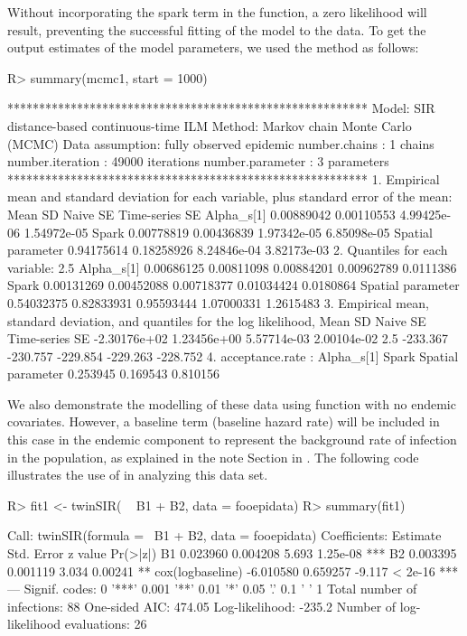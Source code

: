\documentclass[nojss,shortnames]{jss}
\begin{document}
Without incorporating the spark term in the  function, a zero likelihood will result, preventing the successful fitting of the model to the data. To get the output estimates of the model parameters, we used the  method  as follows:
\begin{Sinput}
R> summary(mcmc1, start = 1000)
\end{Sinput}
\begin{Soutput}
********************************************************* 
Model: SIR distance-based continuous-time ILM 
Method: Markov chain Monte Carlo (MCMC) 
Data assumption: fully observed epidemic 
number.chains : 1 chains 
number.iteration : 49000 iterations 
number.parameter : 3 parameters 
********************************************************* 
 1. Empirical mean and standard deviation for each variable,
plus standard error of the mean:
                        Mean         SD    Naive SE Time-series SE
Alpha_s[1]        0.00889042 0.00110553 4.99425e-06    1.54972e-05
Spark             0.00778819 0.00436839 1.97342e-05    6.85098e-05
Spatial parameter 0.94175614 0.18258926 8.24846e-04    3.82173e-03
 2. Quantiles for each variable:
                        2.5%        25%        50%        75%     97.5%
Alpha_s[1]        0.00686125 0.00811098 0.00884201 0.00962789 0.0111386
Spark             0.00131269 0.00452088 0.00718377 0.01034424 0.0180864
Spatial parameter 0.54032375 0.82833931 0.95593444 1.07000331 1.2615483
 3. Empirical mean, standard deviation, and quantiles for the log likelihood,
          Mean             SD       Naive SE Time-series SE 
  -2.30176e+02    1.23456e+00    5.57714e-03    2.00104e-02 
    2.5%      25%      50%      75%    97.5% 
-233.367 -230.757 -229.854 -229.263 -228.752 
 4. acceptance.rate : 
       Alpha_s[1]             Spark Spatial parameter 
         0.253945          0.169543          0.810156 
\end{Soutput}

We also demonstrate the modelling of these data using  function with no endemic covariates. However, a baseline term (baseline hazard rate) will be included in this case in the endemic component to represent the background rate of infection in the population, as explained in the note Section in . The following code illustrates the use of  in analyzing this data set.
\begin{Sinput}
R> fit1 <- twinSIR( ~ B1 + B2, data = fooepidata)
R> summary(fit1)
\end{Sinput}
\begin{Soutput}
Call:
twinSIR(formula = ~B1 + B2, data = fooepidata)
Coefficients:
                  Estimate Std. Error z value Pr(>|z|)    
B1                0.023960   0.004208   5.693 1.25e-08 ***
B2                0.003395   0.001119   3.034  0.00241 ** 
cox(logbaseline) -6.010580   0.659257  -9.117  < 2e-16 ***
---
Signif. codes:  0 '***' 0.001 '**' 0.01 '*' 0.05 '.' 0.1 ' ' 1
Total number of infections:  88 
One-sided AIC: 474.05
Log-likelihood: -235.2
Number of log-likelihood evaluations: 26 
\end{Soutput}
\end{document}
